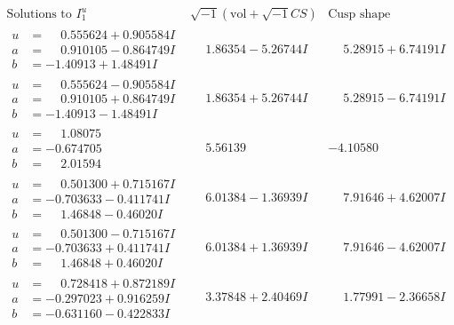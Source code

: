 \documentclass[1p]{elsarticle_modified}
\theoremstyle{definition}
\newcommand{\I}{\sqrt{-1}}
\begin{document}
$$\begin{array}{c|c|c}  
\text{Solutions to }I^u_{1}& \I (\text{vol} + \sqrt{-1}CS) & \text{Cusp shape}\\
 \hline 
\begin{aligned}
u &= \phantom{-}0.555624 + 0.905584 I \\
a &= \phantom{-}0.910105 - 0.864749 I \\
b &= -1.40913 + 1.48491 I\end{aligned}
 & \phantom{-}1.86354 - 5.26744 I & \phantom{-}5.28915 + 6.74191 I \\ \hline\begin{aligned}
u &= \phantom{-}0.555624 - 0.905584 I \\
a &= \phantom{-}0.910105 + 0.864749 I \\
b &= -1.40913 - 1.48491 I\end{aligned}
 & \phantom{-}1.86354 + 5.26744 I & \phantom{-}5.28915 - 6.74191 I \\ \hline\begin{aligned}
u &= \phantom{-}1.08075\phantom{ +0.000000I} \\
a &= -0.674705\phantom{ +0.000000I} \\
b &= \phantom{-}2.01594\phantom{ +0.000000I}\end{aligned}
 & \phantom{-}5.56139\phantom{ +0.000000I} & -4.10580\phantom{ +0.000000I} \\ \hline\begin{aligned}
u &= \phantom{-}0.501300 + 0.715167 I \\
a &= -0.703633 - 0.411741 I \\
b &= \phantom{-}1.46848 - 0.46020 I\end{aligned}
 & \phantom{-}6.01384 - 1.36939 I & \phantom{-}7.91646 + 4.62007 I \\ \hline\begin{aligned}
u &= \phantom{-}0.501300 - 0.715167 I \\
a &= -0.703633 + 0.411741 I \\
b &= \phantom{-}1.46848 + 0.46020 I\end{aligned}
 & \phantom{-}6.01384 + 1.36939 I & \phantom{-}7.91646 - 4.62007 I \\ \hline\begin{aligned}
u &= \phantom{-}0.728418 + 0.872189 I \\
a &= -0.297023 + 0.916259 I \\
b &= -0.631160 - 0.422833 I\end{aligned}
 & \phantom{-}3.37848 + 2.40469 I & \phantom{-}1.77991 - 2.36658 I \\ \hline\begin{aligned}

\end{aligned}
\end{array}$$
\end{document}
